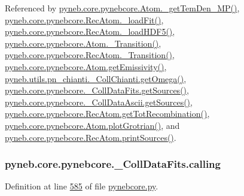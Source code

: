 Referenced by \hyperlink{pynebcore_8py_source_l02046}{pyneb.\-core.\-pynebcore.\-Atom.\-\_\-get\-Tem\-Den\-\_\-\-M\-P()}, \hyperlink{pynebcore_8py_source_l02754}{pyneb.\-core.\-pynebcore.\-Rec\-Atom.\-\_\-load\-Fit()}, \hyperlink{pynebcore_8py_source_l02714}{pyneb.\-core.\-pynebcore.\-Rec\-Atom.\-\_\-load\-H\-D\-F5()}, \hyperlink{pynebcore_8py_source_l01433}{pyneb.\-core.\-pynebcore.\-Atom.\-\_\-\-Transition()}, \hyperlink{pynebcore_8py_source_l02812}{pyneb.\-core.\-pynebcore.\-Rec\-Atom.\-\_\-\-Transition()}, \hyperlink{pynebcore_8py_source_l01782}{pyneb.\-core.\-pynebcore.\-Atom.\-get\-Emissivity()}, \hyperlink{pn__chianti_8py_source_l00507}{pyneb.\-utils.\-pn\-\_\-chianti.\-\_\-\-Coll\-Chianti.\-get\-Omega()}, \hyperlink{pynebcore_8py_source_l00690}{pyneb.\-core.\-pynebcore.\-\_\-\-Coll\-Data\-Fits.\-get\-Sources()}, \hyperlink{pynebcore_8py_source_l01022}{pyneb.\-core.\-pynebcore.\-\_\-\-Coll\-Data\-Ascii.\-get\-Sources()}, \hyperlink{pynebcore_8py_source_l02851}{pyneb.\-core.\-pynebcore.\-Rec\-Atom.\-get\-Tot\-Recombination()}, \hyperlink{pynebcore_8py_source_l02443}{pyneb.\-core.\-pynebcore.\-Atom.\-plot\-Grotrian()}, and \hyperlink{pynebcore_8py_source_l02912}{pyneb.\-core.\-pynebcore.\-Rec\-Atom.\-print\-Sources()}.

\hypertarget{classpyneb_1_1core_1_1pynebcore_1_1___coll_data_fits_a43c9d096f9508cb475cb4fc3552e1979}{
\subsubsection[{calling}]{\setlength{\rightskip}{0pt plus 5cm}pyneb.\-core.\-pynebcore.\-\_\-\-Coll\-Data\-Fits.\-calling}}\label{classpyneb_1_1core_1_1pynebcore_1_1___coll_data_fits_a43c9d096f9508cb475cb4fc3552e1979}


Definition at line \hyperlink{pynebcore_8py_source_l00585}{585} of file \hyperlink{pynebcore_8py_source}{pynebcore.\-py}.



